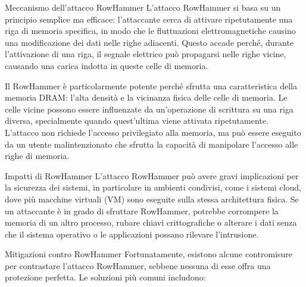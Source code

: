 Meccanismo dell'attacco RowHammer
L'attacco RowHammer si basa su un principio semplice ma efficace: l'attaccante cerca di attivare ripetutamente una riga di memoria specifica, in modo che le fluttuazioni elettromagnetiche causino una modificazione dei dati nelle righe adiacenti. Questo accade perché, durante l'attivazione di una riga, il segnale elettrico può propagarsi nelle righe vicine, causando una carica indotta in queste celle di memoria.

Il RowHammer è particolarmente potente perché sfrutta una caratteristica della memoria DRAM: l'alta densità e la vicinanza fisica delle celle di memoria. Le celle vicine possono essere influenzate da un'operazione di scrittura su una riga diversa, specialmente quando quest'ultima viene attivata ripetutamente. L'attacco non richiede l'accesso privilegiato alla memoria, ma può essere eseguito da un utente malintenzionato che sfrutta la capacità di manipolare l'accesso alle righe di memoria.

 Impatti di RowHammer
L'attacco RowHammer può avere gravi implicazioni per la sicurezza dei sistemi, in particolare in ambienti condivisi, come i sistemi cloud, dove più macchine virtuali (VM) sono eseguite sulla stessa architettura fisica. Se un attaccante è in grado di sfruttare RowHammer, potrebbe corrompere la memoria di un altro processo, rubare chiavi crittografiche o alterare i dati senza che il sistema operativo o le applicazioni possano rilevare l'intrusione.

 Mitigazioni contro RowHammer
Fortunatamente, esistono alcune contromisure per contrastare l'attacco RowHammer, sebbene nessuna di esse offra una protezione perfetta. Le soluzioni più comuni includono:

